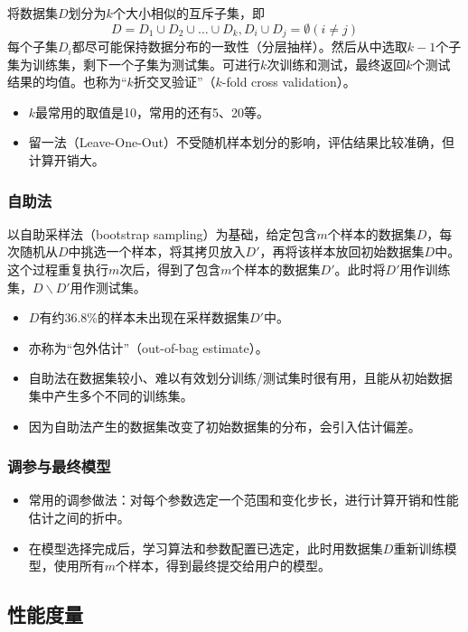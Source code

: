 \documentclass{ctexart}
\begin{document}
						将数据集$D$划分为$k$个大小相似的互斥子集，即\[D=D_1\cup D_2\cup\dots\cup D_k,D_i\cup D_j=\emptyset(i\neq j)\]每个子集$D_i$都尽可能保持数据分布的一致性（分层抽样）。然后从中选取$k-1$个子集为训练集，剩下一个子集为测试集。可进行$k$次训练和测试，最终返回$k$个测试结果的均值。也称为``$k$折交叉验证''（$k$-fold cross validation）。
						\begin{itemize}
							\item $k$最常用的取值是10，常用的还有5、20等。
							\item 留一法（Leave-One-Out）不受随机样本划分的影响，评估结果比较准确，但计算开销大。
						\end{itemize}
					\subsubsection{自助法}
						
						以自助采样法（bootstrap sampling）为基础，给定包含$m$个样本的数据集$D$，每次随机从$D$中挑选一个样本，将其拷贝放入$D'$，再将该样本放回初始数据集$D$中。这个过程重复执行$m$次后，得到了包含$m$个样本的数据集$D'$。此时将$D'$用作训练集，$D\backslash D'$用作测试集。
						\begin{itemize}
							\item $D$有约36.8\%的样本未出现在采样数据集$D'$中。
							\item 亦称为``包外估计''（out-of-bag estimate）。
							\item 自助法在数据集较小、难以有效划分训练/测试集时很有用，且能从初始数据集中产生多个不同的训练集。
							\item 因为自助法产生的数据集改变了初始数据集的分布，会引入估计偏差。
						\end{itemize}
					\subsubsection{调参与最终模型}
						\begin{itemize}
							\item 常用的调参做法：对每个参数选定一个范围和变化步长，进行计算开销和性能估计之间的折中。
							\item 在模型选择完成后，学习算法和参数配置已选定，此时用数据集$D$重新训练模型，使用所有$m$个样本，得到最终提交给用户的模型。
						\end{itemize}
				\subsection{性能度量}
					
\end{document}
